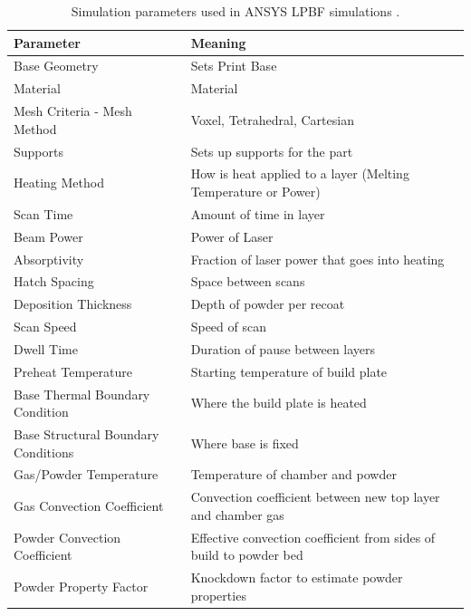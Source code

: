 \begin{table}[H]
  \centering
  \caption{Simulation parameters used in ANSYS LPBF simulations  \cite{ansys_lpbf_simulation_guide_2025r1}.}
  \label{tab:simulation-parameters}
  \begin{tabularx}{\linewidth}{|>{\raggedright\arraybackslash}p{2.5in}|>{\raggedright\arraybackslash}X|}
    \hline
    Parameter & Meaning \\
    \hline
    Base Geometry & Sets Print Base \\
    \hline
    Material & Material \\
    \hline
    Mesh Criteria - Mesh Method & Voxel, Tetrahedral, Cartesian \\
    \hline
    Supports & Sets up supports for the part \\
    \hline
    Heating Method & How is heat applied to a layer (Melting Temperature or Power) \\
    \hline
    Scan Time & Amount of time in layer \\
    \hline
    Beam Power & Power of Laser \\
    \hline
    Absorptivity & Fraction of laser power that goes into heating \\
    \hline
    Hatch Spacing & Space between scans \\
    \hline
    Deposition Thickness & Depth of powder per recoat \\
    \hline
    Scan Speed & Speed of scan \\
    \hline
    Dwell Time & Duration of pause between layers \\
    \hline
    Preheat Temperature & Starting temperature of build plate \\
    \hline
    Base Thermal Boundary Condition & Where the build plate is heated \\
    \hline
    Base Structural Boundary Conditions & Where base is fixed \\
    \hline
    Gas/Powder Temperature & Temperature of chamber and powder \\
    \hline
    Gas Convection Coefficient & Convection coefficient between new top layer and chamber gas \\
    \hline
    Powder Convection Coefficient & Effective convection coefficient from sides of build to powder bed \\
    \hline
    Powder Property Factor & Knockdown factor to estimate powder properties \\
    \hline
  \end{tabularx}
\end{table}

